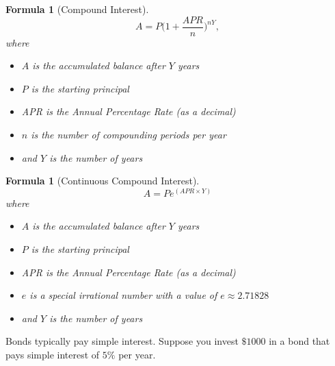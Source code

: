 \documentclass[12pt]{article}
\newtheorem{formula}[theorem]{Formula}
\begin{document}
\begin{formula}[Compound Interest]
	\begin{equation}\label{eq:compound}
		A = P\Big(1 + \frac{APR}{n} \Big)^{nY},
	\end{equation}
	where
	\begin{itemize}
		\item $A$ is the accumulated balance after $Y$ years
		\item $P$ is the starting principal
		\item APR is the Annual Percentage Rate (as a decimal)
		\item $n$ is the number of compounding periods per year
		\item and $Y$ is the number of years
	\end{itemize}
\end{formula}

\pagebreak

\begin{formula}[Continuous Compound Interest]
	\begin{equation}\label{eq:continuous}
		A = Pe^{(APR\times Y)}
	\end{equation}
	where
	\begin{itemize}
		\item $A$ is the accumulated balance after $Y$ years
		\item $P$ is the starting principal
		\item APR is the Annual Percentage Rate (as a decimal)
		\item $e$ is a special irrational number with a value of $e\approx 2.71828$
		\item and $Y$ is the number of years
	\end{itemize}
\end{formula}


Bonds typically pay simple interest.  Suppose you invest $\$1000$ in a bond that pays simple interest of $5\%$ per year.
\end{document}
